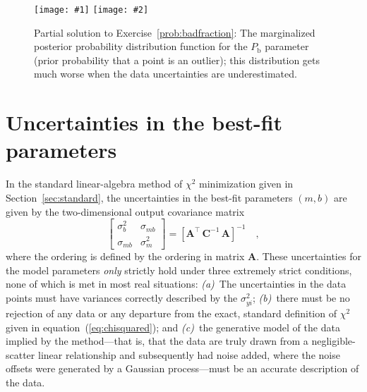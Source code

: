 \documentclass[12pt,twoside,pdftex]{article}
\newcommand{\exampleplottwo}[2]{%
\begin{center}%
\texttt{[image: \#1]}%
\texttt{[image: \#2]}%
\end{center}%
}
\newcommand{\sectionname}{Section}
\newcommand{\equationname}{equation}
\newcommand{\problemname}{Exercise}
\newcounter{problem}
\newcommand{\mmatrix}[1]{\boldsymbol{#1}}
\newcommand{\inverse}[1]{{#1}^{-1}}
\newcommand{\transpose}[1]{{#1}^{\scriptscriptstyle \top}}
\newcommand{\mA}{\mmatrix{A}}
\newcommand{\mAT}{\transpose{\mA}}
\newcommand{\mC}{\mmatrix{C}}
\newcommand{\mCinv}{\inverse{\mC}}
\newcommand{\Pbad}{P_{\mathrm{b}}}
\begin{document}
\begin{figure}[htbp]
\exampleplottwo{exMix1c}{exMix2c}
\caption{Partial solution to \problemname~\ref{prob:badfraction}: The
marginalized posterior probability distribution function for the
$\Pbad$ parameter (prior probability that a point is an outlier); this
distribution gets much worse when the data uncertainties are
underestimated.}\label{fig:badfraction}
\end{figure}

\section{Uncertainties in the best-fit parameters}\label{sec:uncertainty}

In the standard linear-algebra method of $\chi^2$ minimization given
in \sectionname~\ref{sec:standard}, the uncertainties in the best-fit
parameters $(m,b)$ are given by the two-dimensional output covariance
matrix
\begin{equation}
\left[\begin{array}{cc}
\sigma_{b}^2 & \sigma_{mb} \\
\sigma_{mb} & \sigma_{m}^2
\end{array}\right] = \inverse{\left[\mAT\,\mCinv\,\mA\right]} \quad ,
\end{equation}
where the ordering is defined by the ordering in matrix $\mA$.  These
uncertainties for the model parameters \emph{only} strictly hold under
three extremely strict conditions, none of which is met in most real
situations: \textsl{(a)}~The uncertainties in the data points must
have variances correctly described by the $\sigma_{yi}^2$;
\textsl{(b)}~there must be no rejection of any data or any departure
from the exact, standard definition of $\chi^2$ given in
\equationname~(\ref{eq:chisquared}); and \textsl{(c)}~the generative
model of the data implied by the method---that is, that the data are
truly drawn from a negligible-scatter linear relationship and
subsequently had noise added, where the noise offsets were generated
by a Gaussian process---must be an accurate description of the data.
\end{document}

